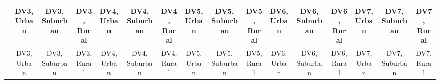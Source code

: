 
\begin{center}
\begin{small}
\begin{longtable}{l@{} c@{} c@{} c@{} c@{} c@{} c@{} c@{} c@{} c@{} c@{} c@{} c@{} c@{} c@{} c@{}}
\hline
 & \shortstack{\rule{0pt}{2.2ex}DV3,\\Urban} & \shortstack{\rule{0pt}{2.2ex}DV3,\\Suburban} & \shortstack{\rule{0pt}{2.2ex}DV3,\\Rural} & \shortstack{\rule{0pt}{2.2ex}DV4,\\Urban} & \shortstack{\rule{0pt}{2.2ex}DV4,\\Suburban} & \shortstack{\rule{0pt}{2.2ex}DV4,\\Rural} & \shortstack{\rule{0pt}{2.2ex}DV5,\\Urban} & \shortstack{\rule{0pt}{2.2ex}DV5,\\Suburban} & \shortstack{\rule{0pt}{2.2ex}DV5,\\Rural} & \shortstack{\rule{0pt}{2.2ex}DV6,\\Urban} & \shortstack{\rule{0pt}{2.2ex}DV6,\\Suburban} & \shortstack{\rule{0pt}{2.2ex}DV6,\\Rural} & \shortstack{\rule{0pt}{2.2ex}DV7,\\Urban} & \shortstack{\rule{0pt}{2.2ex}DV7,\\Suburban} & \shortstack{\rule{0pt}{2.2ex}DV7,\\Rural} \\
\hline
\endfirsthead
\hline
 & \shortstack{\rule{0pt}{2.2ex}DV3,\\Urban} & \shortstack{\rule{0pt}{2.2ex}DV3,\\Suburban} & \shortstack{\rule{0pt}{2.2ex}DV3,\\Rural} & \shortstack{\rule{0pt}{2.2ex}DV4,\\Urban} & \shortstack{\rule{0pt}{2.2ex}DV4,\\Suburban} & \shortstack{\rule{0pt}{2.2ex}DV4,\\Rural} & \shortstack{\rule{0pt}{2.2ex}DV5,\\Urban} & \shortstack{\rule{0pt}{2.2ex}DV5,\\Suburban} & \shortstack{\rule{0pt}{2.2ex}DV5,\\Rural} & \shortstack{\rule{0pt}{2.2ex}DV6,\\Urban} & \shortstack{\rule{0pt}{2.2ex}DV6,\\Suburban} & \shortstack{\rule{0pt}{2.2ex}DV6,\\Rural} & \shortstack{\rule{0pt}{2.2ex}DV7,\\Urban} & \shortstack{\rule{0pt}{2.2ex}DV7,\\Suburban} & \shortstack{\rule{0pt}{2.2ex}DV7,\\Rural} \\

\end{longtable}
\end{small}
\end{center}
